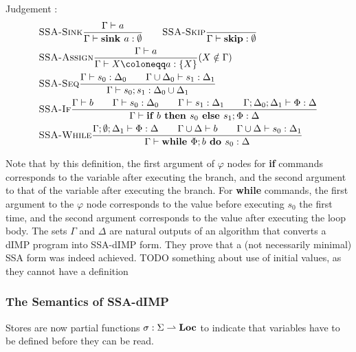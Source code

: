 Judgement :
\begin{align*}
    &\rule{SSA-Sink}{\typestmt{\Gamma}{a}}{\typestep{\Gamma}{\sink{a}}{\emptyset}}\qquad
    \rule{SSA-Skip}{}{\typestep{\Gamma}{\skipcmd}{\emptyset}}\\
    &\rule{SSA-Assign}{\typestmt{\Gamma}{a}}{\typestep{\Gamma}{\defaultstore}{\{X\}}} \text{($X \notin \Gamma$)}\\
    &\rule{SSA-Seq}{\typestep{\Gamma}{s_0}{\Delta_0}\qquad
    \typestep{\Gamma \cup \Delta_0}{s_1}{\Delta_1}}{\typestep{\Gamma}{\defaultssaseq}{\Delta_0 \cup \Delta_1}}\\
    &\rule{SSA-If}{\typestmt{\Gamma}{b}\qquad\typestep{\Gamma}{s_0}{\Delta_0}\qquad \typestep{\Gamma}{s_1}{\Delta_1}\qquad
    \typestep{\Gamma;\Delta_0;\Delta_1}{\philist}{\Delta}}
    {\typestep{\Gamma}{\defaultssaif}{\Delta}}\\
    &\rule{SSA-While}{\typestep{\Gamma;\emptyset;\Delta_1}{\philist}{\Delta}\qquad
    \typestmt{\Gamma \cup \Delta}{b}\qquad\typestep{\Gamma \cup \Delta}{s_0}{\Delta_1}}
    {\typestep{\Gamma}{\defaultssawhile}{\Delta}}
\end{align*}

Note that by this definition, the first argument of $\varphi$ nodes for \textbf{if} commands
corresponds to the variable after executing the \btrue{} branch, and the second argument to that
of the variable after executing the \bfalse{} branch.
For \textbf{while} commands, the first argument to the $\varphi$ node corresponds to the value
before executing $s_0$ the first time, and the second argument corresponds to the value 
after executing the loop body.
The sets $\Gamma$ and $\Delta$ are natural outputs of an algorithm that converts a 
dIMP program into SSA-dIMP form.
They prove that a (not necessarily minimal) SSA form was indeed achieved.
TODO something about use of initial values, as they cannot have a definition

\subsubsection*{The Semantics of SSA-dIMP}
Stores are now partial functions $\sigma : \Sigma \rightharpoonup \textbf{Loc}$ to indicate that
variables have to be defined before they can be read.

